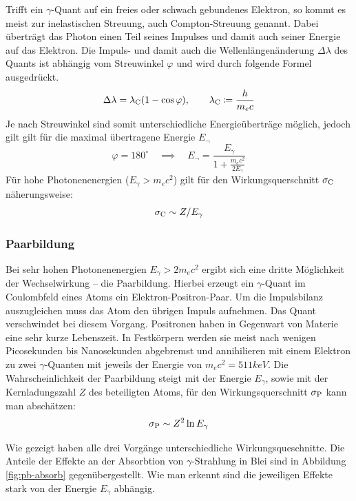 			Trifft ein $\gamma$-Quant auf ein freies oder schwach gebundenes Elektron, so kommt es meist zur inelastischen Streuung, auch Compton-Streuung genannt.
			Dabei überträgt das Photon einen Teil seines Impulses und damit auch seiner Energie auf das Elektron.
			Die Impuls- und damit auch die Wellenlängenänderung $\Delta \lambda$ des Quants ist abhängig vom Streuwinkel $\varphi$ und wird durch folgende Formel ausgedrückt.
			\[ \Delta \lambda = \lambda_{\mathrm{C}} (1 - \cos \varphi),\qquad \lambda_{\mathrm{C}} \coloneqq \frac{h}{m_e c} \]
			Je nach Streuwinkel sind somit unterschiedliche Energieüberträge möglich, jedoch gilt gilt für die maximal übertragene Energie $E_\neg$
			\[ \varphi = 180^\circ \quad \implies \quad E_\neg = \frac{E_\gamma}{1 + \frac{m_e c^2}{2 E_\gamma} } \]
			Für hohe Photonenenergien ($E_\gamma > m_e c^2$) gilt für den Wirkungsquerschnitt $\sigma_{\mathrm{C}}$ näherungsweise:
			\[ \sigma_{\mathrm{C}} \sim Z / E_\gamma \]


		\subsubsection{Paarbildung}
		\label{sssec:paarbildung}
		
			Bei sehr hohen Photonenenergien $E_\gamma > 2 m_e c^2$ ergibt sich eine dritte Möglichkeit der Wechselwirkung -- die Paarbildung.
			Hierbei erzeugt ein $\gamma$-Quant im Coulombfeld eines Atoms ein Elektron-Positron-Paar.
			Um die Impulsbilanz auszugleichen muss das Atom den übrigen Impuls aufnehmen.
			Das Quant verschwindet bei diesem Vorgang.
			Positronen haben in Gegenwart von Materie eine sehr kurze Lebenszeit.
			In Festkörpern werden sie meist nach wenigen Picosekunden bis Nanosekunden abgebremst und annihilieren mit einem Elektron zu zwei $\gamma$-Quanten mit jeweils der Energie von $m_e c^2 = 511 \unit{keV}$.
			Die Wahrscheinlichkeit der Paarbildung steigt mit der Energie $E_\gamma$, sowie mit der Kernladungszahl $Z$ des beteiligten Atoms, für den Wirkungsquerschnitt $\sigma_{\mathrm{P}}$ kann man abschätzen:
			\[ \sigma_{\mathrm{P}} \sim Z^2 \ln E_\gamma \]
		

		Wie gezeigt haben alle drei Vorgänge unterschiedliche Wirkungsqueschnitte.
		Die Anteile der Effekte an der Absorbtion von $\gamma$-Strahlung in Blei sind in Abbildung \ref{fig:pb-absorb} gegenübergestellt.
		Wie man erkennt sind die jeweiligen Effekte stark von der Energie $E_\gamma$ abhängig.

